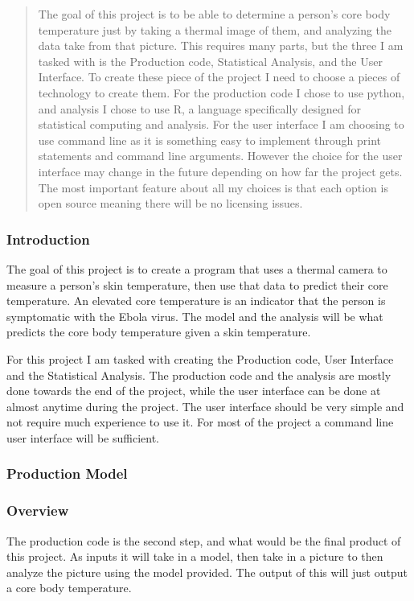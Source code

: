 
\begin{abstract}
The goal of this project is to be able to determine a person’s core body temperature just by taking a thermal image of them, and analyzing the data take from that picture. This requires many parts, but the three I am tasked with is the Production code, Statistical Analysis, and the User Interface. To create these piece of the project I need to choose a pieces of technology to create them. For the production code I chose to use python, and analysis I chose to use R, a language specifically designed for statistical computing and analysis. For the user interface I am choosing to use command line as it is something easy to implement through print statements and command line arguments. However the choice for the user interface may change in the future depending on how far the project gets. The most important feature about all my choices is that each option is open source meaning there will be no licensing issues.
\end{abstract}

\subsubsection*{Introduction}
The goal of this project is to create a program that uses a thermal camera to measure a person's skin temperature, then use that data to predict their core temperature. An elevated core temperature is an indicator that the person is symptomatic with the Ebola virus. The model and the analysis will be what predicts the core body temperature given a skin temperature.

For this project I am tasked with creating the Production code, User Interface and the Statistical Analysis. The production code and the analysis are mostly done towards the end of the project, while the user interface can be done at almost anytime during the project. The user interface should be very simple and not require much experience to use it. For most of the project a command line user interface will be sufficient.

\subsubsection*{Production Model}
	\subsubsection*{Overview}
	The production code is the second step, and what would be the final product of this project. As inputs it will take in a model, then take in a picture to then analyze the picture using the model provided. The output of this will just output a core body temperature.
